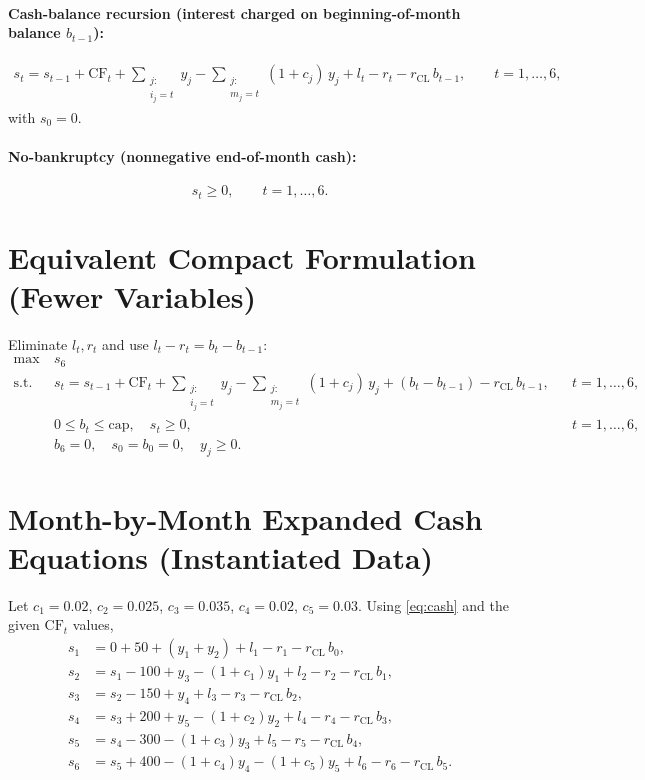 \documentclass[11pt]{article}
\begin{document}
\paragraph{Cash-balance recursion (interest charged on beginning-of-month balance $b_{t-1}$):}
\begin{align}
s_t
= s_{t-1} + \mathrm{CF}_t
+ \sum_{\substack{j:\\ i_j=t}} y_j
- \sum_{\substack{j:\\ m_j=t}} (1+c_j)\, y_j
+ l_t - r_t
- r_{\mathrm{CL}}\, b_{t-1},
\qquad t=1,\dots,6, \label{eq:cash}
\end{align}
with $s_0=0$.

\paragraph{No-bankruptcy (nonnegative end-of-month cash):}
\begin{equation}
s_t \ge 0,\qquad t=1,\dots,6. \label{eq:nobank}
\end{equation}

\section*{Equivalent Compact Formulation (Fewer Variables)}

Eliminate $l_t,r_t$ and use $l_t - r_t = b_t - b_{t-1}$:
\begin{align}
\max\ & s_6 \nonumber\\
\text{s.t. }\
& s_t
= s_{t-1} + \mathrm{CF}_t
+ \sum_{\substack{j:\\ i_j=t}} y_j
- \sum_{\substack{j:\\ m_j=t}} (1+c_j)\, y_j
+ (b_t - b_{t-1})
- r_{\mathrm{CL}}\, b_{t-1},
&& t=1,\dots,6, \label{eq:cashcompact}\\
& 0 \le b_t \le \mathrm{cap},\quad s_t \ge 0, && t=1,\dots,6, \label{eq:capcompact}\\
& b_6=0,\quad s_0=b_0=0,\quad y_j\ge 0. \label{eq:termcompact}
\end{align}

\section*{Month-by-Month Expanded Cash Equations (Instantiated Data)}

Let $c_1=0.02$, $c_2=0.025$, $c_3=0.035$, $c_4=0.02$, $c_5=0.03$. Using \eqref{eq:cash} and the given $\mathrm{CF}_t$ values,
\begin{align*}
s_1 &= 0 + 50 + (y_1+y_2) + l_1 - r_1 - r_{\mathrm{CL}}\, b_0,\\
s_2 &= s_1 - 100 + y_3 - (1+c_1)y_1 + l_2 - r_2 - r_{\mathrm{CL}}\, b_1,\\
s_3 &= s_2 - 150 + y_4 + l_3 - r_3 - r_{\mathrm{CL}}\, b_2,\\
s_4 &= s_3 + 200 + y_5 - (1+c_2)y_2 + l_4 - r_4 - r_{\mathrm{CL}}\, b_3,\\
s_5 &= s_4 - 300 - (1+c_3)y_3 + l_5 - r_5 - r_{\mathrm{CL}}\, b_4,\\
s_6 &= s_5 + 400 - (1+c_4)y_4 - (1+c_5)y_5 + l_6 - r_6 - r_{\mathrm{CL}}\, b_5.
\end{align*}
\end{document}
